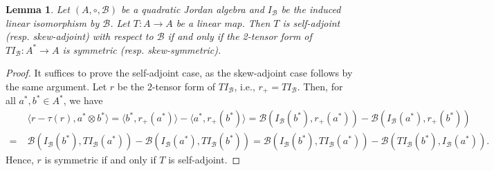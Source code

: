 \documentclass[12pt, reqno, a4paper]{amsart}
\newtheorem{lemma}[theorem]{Lemma}
\theoremstyle{definition}
\begin{document}
\begin{lemma}\label{lem:sa2s}
	Let $(A, \circ, \mathcal{B})$ be a quadratic Jordan algebra and $I_\mathcal{B}$ be the induced linear isomorphism by $\mathcal{B}$. Let $T: A \to A$ be a linear map.
	Then $T$ is self-adjoint (resp. skew-adjoint) with respect to $\mathcal{B}$ if and only if the 2-tensor form of $T I_\mathcal{B}: A^* \to A$ is symmetric (resp. skew-symmetric).
\end{lemma}
\begin{proof}
	It suffices to prove the self-adjoint case, as the skew-adjoint case follows by the same argument.
	Let $r$ be the 2-tensor form of $T I_{\mathcal{B}}$, i.e., $r_{+} = T I_{\mathcal{B}}$.
	Then, for all $a^*, b^* \in A^*$, we have
	\begin{align*}
		& \langle r - \tau(r), a^* \otimes b^* \rangle = \langle b^*, r_{+}(a^*) \rangle - \langle a^*, r_{+}(b^*) \rangle = \mathcal{B}(I_{\mathcal{B}}(b^*), r_{+}(a^*)) - \mathcal{B}(I_{\mathcal{B}}(a^*), r_{+}(b^*)) \\
		=\; & \mathcal{B}(I_{\mathcal{B}}(b^*), T I_{\mathcal{B}}(a^*)) - \mathcal{B}(I_{\mathcal{B}}(a^*), T I_{\mathcal{B}}(b^*)) = \mathcal{B}(I_{\mathcal{B}}(b^*), T I_{\mathcal{B}}(a^*)) - \mathcal{B}(T I_{\mathcal{B}}(b^*), I_{\mathcal{B}}(a^*)).
	\end{align*}
	Hence, $r$ is symmetric if and only if $T$ is self-adjoint.
\end{proof}
\end{document}
